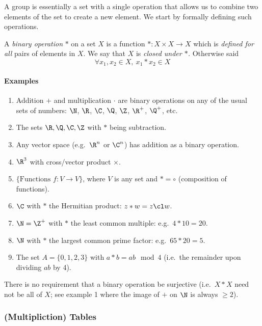 A group is essentially a set with a single operation that allows us to combine two elements of the set to create a new element. We start by formally defining such operations.

\begin{defn}
A \emph{binary operation} $*$ on a set $X$ is a function $*:X\times X\to X$ which is \emph{defined for all} pairs of elements in $X$. We say that $X$ is \emph{closed under $*$.} Otherwise said
\[\forall x_1,x_2\in X,\ x_1*x_2\in X\] 
\end{defn}

\paragraph{Examples}
\begin{enumerate}
	\item Addition $+$ and multiplication $\cdot$ are binary operations on any of the usual sets of numbers: $\N$, $\R$, $\C$, $\Q$, $\Z$, $\R^+$, $\Q^+$, etc.
	\item The sets $\R,\Q,\C,\Z$ with $*$ being subtraction.
	\item Any vector space (e.g.\ $\R^n$ or $\C^n$) has addition as a binary operation.
	\item $\R^3$ with cross/vector product $\times$.
	\item $\{\text{Functions } f:V\to V\}$, where $V$ is any set and $*=\circ$ (composition of functions).
	\item $\C$ with $*$ the Hermitian product: $z*w=z \cl w$.
	\item $\N=\Z^+$ with $*$ the least common multiple: e.g.\ $4*10=20$.
	\item $\N$ with $*$ the largest common prime factor: e.g.\ $65*20=5$.
	\item The set $A=\{0,1,2,3\}$ with $a*b=ab \mod 4$ (i.e.\ the remainder upon dividing $ab$ by 4).
\end{enumerate}

There is no requirement that a binary operation be surjective (i.e.\ $X*X$ need not be all of $X$; see example 1 where the image of $+$ on $\N$ is always $\ge 2$).

\subsubsection*{(Multipliction) Tables}

